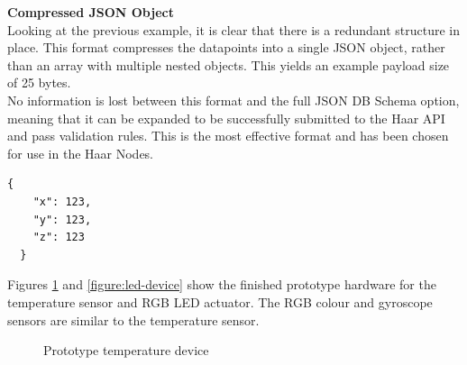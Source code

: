       \noindent
      \begin{minipage}[t]{0.45\textwidth}
        \textbf{Compressed JSON Object}\\
        Looking at the previous example, it is clear that there is a redundant structure in place. This format compresses the datapoints into a single JSON object, rather than an array with multiple nested objects. This yields an example payload size of 25 bytes.\\

        No information is lost between this format and the full JSON DB Schema option, meaning that it can be expanded to be successfully submitted to the Haar API and pass validation rules. This is the most effective format and has been chosen for use in the Haar Nodes. 
      \end{minipage}
      \hfill
      \begin{minipage}[t]{0.45\textwidth}
        \begin{lstlisting}[frame=single]
  {
    "x": 123,
    "y": 123,
    "z": 123
  }
        \end{lstlisting}
      \end{minipage}

      Figures \ref{figure:temp-device} and \ref{figure:led-device} show the finished prototype hardware for the temperature sensor and RGB LED actuator. The RGB colour and gyroscope sensors are similar to the temperature sensor. 

      \begin{figure}
        \centering
        \caption{Prototype temperature device}\label{figure:temp-device}
      \end{figure}

